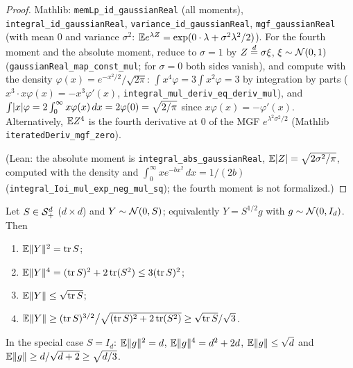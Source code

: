 \begin{proof}
Mathlib: \texttt{memLp\_id\_gaussianReal} (all moments), \texttt{integral\_id\_gaussianReal},
\texttt{variance\_id\_gaussianReal}, \texttt{mgf\_gaussianReal} (with mean $0$ and variance
$\sigma^2$: $\mathbb{E} e^{\lambda Z} = \exp(0\cdot\lambda + \sigma^2\lambda^2/2)$). For the fourth
moment and the absolute moment, reduce to $\sigma = 1$ by $Z \overset{d}{=} \sigma\xi$,
$\xi \sim \mathcal{N}(0,1)$ (\texttt{gaussianReal\_map\_const\_mul}; for $\sigma = 0$ both sides
vanish), and compute with the density $\varphi(x) = e^{-x^2/2}/\sqrt{2\pi}$:
$\int x^4\varphi = 3\int x^2\varphi = 3$ by integration by parts
($x^3\cdot x\varphi(x) = -x^3\varphi'(x)$, \texttt{integral\_mul\_deriv\_eq\_deriv\_mul}), and
$\int\lvert x \rvert\varphi = 2\int_0^\infty x\varphi(x)\,dx = 2\varphi(0) = \sqrt{2/\pi}$ since
$x\varphi(x) = -\varphi'(x)$. Alternatively, $\mathbb{E} Z^4$ is the fourth derivative at $0$ of the
MGF $e^{\lambda^2\sigma^2/2}$ (Mathlib \texttt{iteratedDeriv\_mgf\_zero}).

(Lean: the absolute moment is \texttt{integral\_abs\_gaussianReal}, $\mathbb{E}\lvert Z \rvert = \sqrt{2\sigma^2/\pi}$,
computed with the density and $\int_0^\infty xe^{-bx^2}\,dx = 1/(2b)$
(\texttt{integral\_Ioi\_mul\_exp\_neg\_mul\_sq}); the fourth moment is not formalized.)
\end{proof}

\begin{lemma}\label{lem:gauss_norm_moments}
Let $S \in \mathcal{S}_{+}^{d}$ ($d \times d$) and $Y \sim \mathcal{N}(0, S)$; equivalently $Y = S^{1/2}g$ with
$g \sim \mathcal{N}(0,I_d)$. Then
\begin{enumerate}
  \item[(i)] $\mathbb{E}\lVert Y \rVert^2 = \operatorname{tr} S$;
  \item[(ii)] $\mathbb{E}\lVert Y \rVert^4 = (\operatorname{tr} S)^2 + 2\operatorname{tr}(S^2) \le 3(\operatorname{tr} S)^2$;
  \item[(iii)] $\mathbb{E}\lVert Y \rVert \le \sqrt{\operatorname{tr} S}$;
  \item[(iv)] $\mathbb{E}\lVert Y \rVert \ge (\operatorname{tr} S)^{3/2}\big/\sqrt{(\operatorname{tr} S)^2 + 2\operatorname{tr}(S^2)} \ge \sqrt{\operatorname{tr} S}/\sqrt3$.
\end{enumerate}
In the special case $S = I_d$: $\mathbb{E}\lVert g \rVert^2 = d$, $\mathbb{E}\lVert g \rVert^4 = d^2 + 2d$,
$\mathbb{E}\lVert g \rVert \le \sqrt d$ and $\mathbb{E}\lVert g \rVert \ge d/\sqrt{d+2} \ge \sqrt{d/3}$.
\end{lemma}

